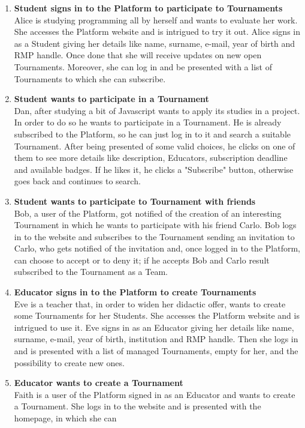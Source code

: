 \begin{enumerate}[label= \textbf{SC\arabic*}]
    \item \textbf{Student signs in to the Platform to participate to Tournaments} \label{sc:sc1}\\ Alice is studying programming all by herself and wants to evaluate her work. She accesses the Platform website and is intrigued to try it out. 
    Alice signs in as a Student giving her details like name, surname, e-mail, year of birth and RMP handle. Once done that she will receive updates on new open Tournaments. Moreover, she can log in and be presented with a list 
    of Tournaments to which she can subscribe.
    \item \textbf{Student wants to participate in a Tournament} \label{sc:sc2}\\ Dan, after studying a bit of Javascript wants to apply its studies in a project. In order to do so he wants to participate in a Tournament. He is already subscribed 
    to the Platform, so he can just log in to it and search a suitable Tournament. After being presented of some valid choices, he clicks on one of them to see more details like description, Educators, subscription deadline and 
    available badges. If he likes it, he clicks a "Subscribe" button, otherwise goes back and continues to search.
    \item \textbf{Student wants to participate to Tournament with friends} \label{sc:sc3}\\ Bob, a user of the Platform, got notified of the creation of an interesting Tournament in which he wants to participate with his friend Carlo. Bob logs in 
    to the website and subscribes to the Tournament sending an invitation to Carlo, who gets notified of the invitation and, once logged in to the Platform, can choose to accept or to deny it; if he accepts Bob and Carlo result 
    subscribed to the Tournament as a Team.
    \item \textbf{Educator signs in to the Platform to create Tournaments} \label{sc:sc4}\\ Eve is a teacher that, in order to widen her didactic offer, wants to create some Tournaments for her Students. She accesses the Platform website and is 
    intrigued to use it. Eve signs in as an Educator giving her details like name, surname, e-mail, year of birth, institution and RMP handle. Then she logs in and is presented with a list of managed Tournaments, empty for her, 
    and the possibility to create new ones.
    \item \textbf{Educator wants to create a Tournament} \label{sc:sc5}\\ Faith is a user of the Platform signed in as an Educator and wants to create a Tournament. She logs in to the website and is presented with the homepage, in which she can 

\end{enumerate}

